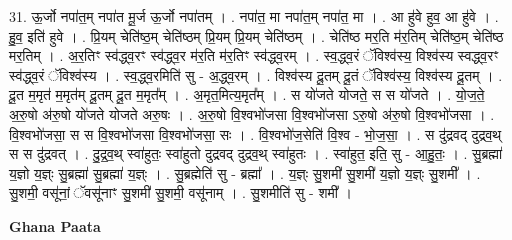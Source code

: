 \documentclass[17pt]{extarticle}
\begin{document}
31. ऊ॒र्जो नपा॑त॒म् नपा॑त मू॒र्ज ऊ॒र्जो नपा॑तम् । . नपा॑त॒ मा नपा॑त॒म् नपा॑त॒ मा । . आ हु॑वे हुव॒ आ हु॑वे । . हु॒व॒ इति॑ हुवे । . प्रि॒यम् चेति॑ष्ठ॒म् चेति॑ष्ठम् प्रि॒यम् प्रि॒यम् चेति॑ष्ठम् । . चेति॑ष्ठ मर॒ति म॑र॒तिम् चेति॑ष्ठ॒म् चेति॑ष्ठ मर॒तिम् । . अ॒र॒तिꣳ स्व॑द्ध्व॒रꣳ स्व॑द्ध्व॒र म॑र॒ति म॑र॒तिꣳ स्व॑द्ध्व॒रम् । . स्व॒द्ध्व॒रं ॅविश्व॑स्य॒ विश्व॑स्य स्वद्ध्व॒रꣳ स्व॑द्ध्व॒रं ॅविश्व॑स्य । . स्व॒द्ध्व॒रमिति॑ सु - अ॒द्ध्व॒रम् । . विश्व॑स्य दू॒तम् दू॒तं ॅविश्व॑स्य॒ विश्व॑स्य दू॒तम् । . दू॒त म॒मृत॑ म॒मृत॑म् दू॒तम् दू॒त म॒मृत᳚म् । . अ॒मृत॒मित्य॒मृत᳚म् । . स यो॑जते योजते॒ स स यो॑जते । . यो॒ज॒ते॒ अ॒रु॒षो अ॑रु॒षो यो॑जते योजते अरु॒षः । . अ॒रु॒षो वि॒श्वभो॑जसा वि॒श्वभो॑जसा ऽरु॒षो अ॑रु॒षो वि॒श्वभो॑जसा । . वि॒श्वभो॑जसा॒ स स वि॒श्वभो॑जसा वि॒श्वभो॑जसा॒ सः । . वि॒श्वभो॑ज॒सेति॑ वि॒श्व - भो॒ज॒सा॒ । . स दु॑द्रवद् दुद्रव॒थ् स स दु॑द्रवत् । . दु॒द्र॒व॒थ् स्वा॑हुतः॒ स्वा॑हुतो दुद्रवद् दुद्रव॒थ् स्वा॑हुतः । . स्वा॑हुत॒ इति॒ सु - आ॒हु॒तः॒ । . सु॒ब्रह्मा॑ य॒ज्ञो य॒ज्ञ्ः सु॒ब्रह्मा॑ सु॒ब्रह्मा॑ य॒ज्ञ्ः । . सु॒ब्रह्मेति॑ सु - ब्रह्मा᳚ । . य॒ज्ञ्ः सु॒शमी॑ सु॒शमी॑ य॒ज्ञो य॒ज्ञ्ः सु॒शमी᳚ । . सु॒शमी॒ वसू॑नां॒ ॅवसू॑नाꣳ सु॒शमी॑ सु॒शमी॒ वसू॑नाम् । . सु॒शमीति॑ सु - शमी᳚ । \newline

\textbf{Ghana Paata } \newline
\end{document}
